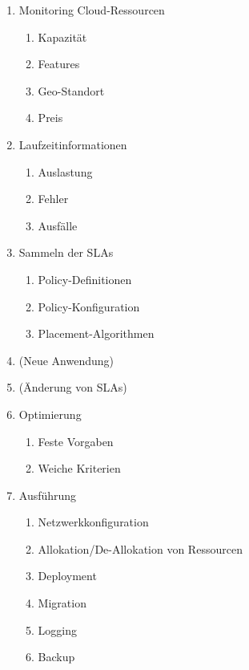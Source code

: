 \begin{minipage}[b]{0.45\linewidth}
\begin{flushleft}
\begin{enumerate}
\item Monitoring Cloud-Ressourcen
\begin{enumerate}
	\item Kapazität%
	\item Features%
	\item Geo-Standort
	\item Preis
\end{enumerate}
\item Laufzeitinformationen%
\begin{enumerate}
	\item Auslastung
	\item Fehler
	\item Ausfälle
\end{enumerate}
\item Sammeln der SLAs
\begin{enumerate}
	\item Policy-Definitionen
	\item Policy-Konfiguration
	\item Placement-Algorithmen
\end{enumerate}
\end{enumerate}
\end{flushleft}
\end{minipage}
%
\hspace{0.5cm}
%
\begin{minipage}[b]{0.45\linewidth}	
\begin{enumerate}
\setcounter{enumi}{3}
\item (Neue Anwendung)
\item (Änderung von SLAs)
\item Optimierung
\begin{enumerate}
	\item Feste Vorgaben%
	\item Weiche Kriterien%
\end{enumerate}
\item Ausführung
\begin{enumerate}
	\item Netzwerkkonfiguration
	\item Allokation/De-Allokation von Ressourcen
	\item Deployment
	\item Migration
	\item Logging%
	\item Backup
\end{enumerate}
\end{enumerate}
\end{minipage}

